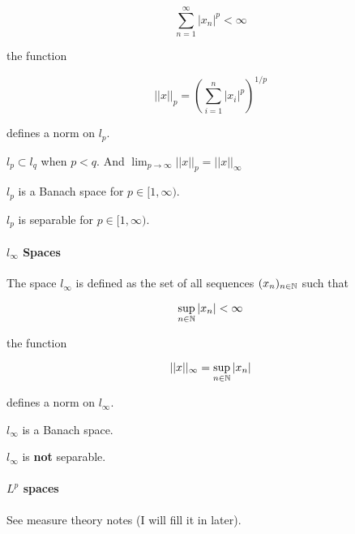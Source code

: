 \documentclass{article}
\begin{document}
\begin{equation*}
    \sum_{n=1}^{\infty} |x_n|^p < \infty
\end{equation*}

the function  

\begin{equation*}
    ||x||_p = \left(\sum_{i=1}^n |x_i|^p\right)^{1/p}
\end{equation*}  

defines a norm on $l_p$.  
\begin{remark}
    $l_p \subset l_q$ when $p < q$. And $\lim_{p\to \infty} ||x||_p = ||x||_{\infty}$
\end{remark}  

\begin{prop}
    $l_p$ is a Banach space for $p \in [1,\infty)$.
\end{prop}  

\begin{prop}
    $l_p$ is separable for $p \in [1,\infty)$.
\end{prop}  


\paragraph*{$l_\infty$ Spaces}  
The space $l_\infty$ is defined as the set of all sequences $(x_n)_{n\in \mathbb{N}}$ such that

\begin{equation*}
    \sup_{n\in \mathbb{N}} |x_n| < \infty
\end{equation*}

the function

\begin{equation*}
    ||x||_\infty = \sup_{n\in \mathbb{N}} |x_n|
\end{equation*}

defines a norm on $l_\infty$.  

\begin{prop}
    $l_\infty$ is a Banach space.
\end{prop}

\begin{prop}
    $l_{\infty}$ is \textbf{not} separable.  
\end{prop} 

\paragraph*{$L^p$ spaces}  

See measure theory notes (I will fill it in later).
\end{document}
